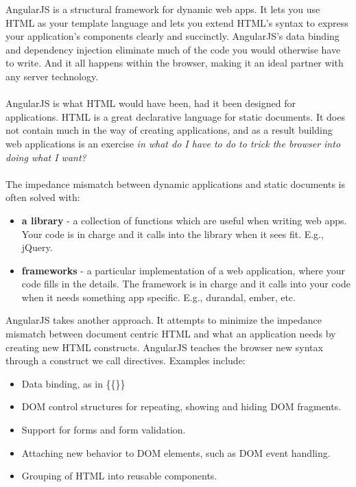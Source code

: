 \documentclass[12pt]{article}
\begin{document}
	AngularJS is a structural framework for dynamic web apps. It lets you use HTML as your template language and lets you extend HTML's syntax to express your application's components clearly and succinctly. AngularJS's data binding and dependency injection eliminate much of the code you would otherwise have to write.  And it all happens within the browser, making it an ideal partner with any server technology.
	\\
	\\
	AngularJS is what HTML would have been, had it been designed for applications. HTML is a great declarative language for static documents. It does not contain much in the way of creating applications, and as a result building web applications is an exercise \textit{in what do I have to do to trick the browser into doing what I want?}
	\\
	\\
	The impedance mismatch between dynamic applications and static documents is often solved with:
	\begin{itemize}
		
		\item \textbf{a library} - a collection of functions which are useful when writing web apps. Your code is in charge and it calls into the library when it sees fit. E.g., \colorbox{mygray}{jQuery}.
		\item \textbf{frameworks} - a particular implementation of a web application, where your code fills in the details. The framework is in charge and it calls into your code when it needs something app specific. E.g., \colorbox{mygray}{durandal}, \colorbox{mygray}{ember}, etc.
	\end{itemize}
	AngularJS takes another approach. It attempts to minimize the impedance mismatch between document centric HTML and what an application needs by creating new HTML constructs. AngularJS teaches the browser new syntax through a construct we call directives. Examples include:
	\begin{itemize}
		\item Data binding, as in \colorbox{mygray}{\{\{\}\}}
		\item DOM control structures for repeating, showing and hiding DOM fragments.
		\item Support for forms and form validation.
		\item Attaching new behavior to DOM elements, such as DOM event handling.
		\item Grouping of HTML into reusable components.
		
	\end{itemize}
	
\end{document}
